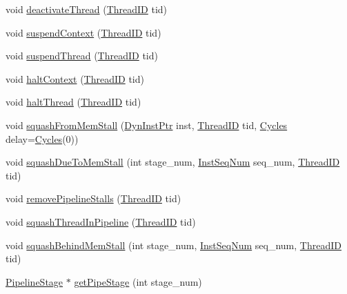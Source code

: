 \begin{DoxyCompactItemize}
\item 
void \hyperlink{classInOrderCPU_ad11d9216ad92d9036ebf37844cf6e706}{deactivateThread} (\hyperlink{base_2types_8hh_ab39b1a4f9dad884694c7a74ed69e6a6b}{ThreadID} tid)
\item 
void \hyperlink{classInOrderCPU_aed2e2b9af515a66bdde61b85f150856a}{suspendContext} (\hyperlink{base_2types_8hh_ab39b1a4f9dad884694c7a74ed69e6a6b}{ThreadID} tid)
\item 
void \hyperlink{classInOrderCPU_aee7a498a20266fbfbc6aa3f165577b68}{suspendThread} (\hyperlink{base_2types_8hh_ab39b1a4f9dad884694c7a74ed69e6a6b}{ThreadID} tid)
\item 
void \hyperlink{classInOrderCPU_ac2156e0955d5e1ef6e06cd0e2ab218e4}{haltContext} (\hyperlink{base_2types_8hh_ab39b1a4f9dad884694c7a74ed69e6a6b}{ThreadID} tid)
\item 
void \hyperlink{classInOrderCPU_a79e607a97980c07fc8d6d0b42a6ee225}{haltThread} (\hyperlink{base_2types_8hh_ab39b1a4f9dad884694c7a74ed69e6a6b}{ThreadID} tid)
\item 
void \hyperlink{classInOrderCPU_a3b9652a69ff2d5c02c1b696c1007ac9d}{squashFromMemStall} (\hyperlink{classRefCountingPtr}{DynInstPtr} inst, \hyperlink{base_2types_8hh_ab39b1a4f9dad884694c7a74ed69e6a6b}{ThreadID} tid, \hyperlink{classCycles}{Cycles} delay=\hyperlink{classCycles}{Cycles}(0))
\item 
void \hyperlink{classInOrderCPU_a302751e3ba3d567b01c7446f9227a2da}{squashDueToMemStall} (int stage\_\-num, \hyperlink{inst__seq_8hh_a258d93d98edaedee089435c19ea2ea2e}{InstSeqNum} seq\_\-num, \hyperlink{base_2types_8hh_ab39b1a4f9dad884694c7a74ed69e6a6b}{ThreadID} tid)
\item 
void \hyperlink{classInOrderCPU_ace0d67fcac674ca759a8b0bc3acc7a05}{removePipelineStalls} (\hyperlink{base_2types_8hh_ab39b1a4f9dad884694c7a74ed69e6a6b}{ThreadID} tid)
\item 
void \hyperlink{classInOrderCPU_a53bed7b6c73f79636a1c6b918eb08f35}{squashThreadInPipeline} (\hyperlink{base_2types_8hh_ab39b1a4f9dad884694c7a74ed69e6a6b}{ThreadID} tid)
\item 
void \hyperlink{classInOrderCPU_a7c7508de9bcbfd4fa1fafd285a8f3930}{squashBehindMemStall} (int stage\_\-num, \hyperlink{inst__seq_8hh_a258d93d98edaedee089435c19ea2ea2e}{InstSeqNum} seq\_\-num, \hyperlink{base_2types_8hh_ab39b1a4f9dad884694c7a74ed69e6a6b}{ThreadID} tid)
\item 
\hyperlink{classPipelineStage}{PipelineStage} $\ast$ \hyperlink{classInOrderCPU_a4354c88eea8c78cc39d43d8c5f4c6b46}{getPipeStage} (int stage\_\-num)

\end{DoxyCompactItemize}
